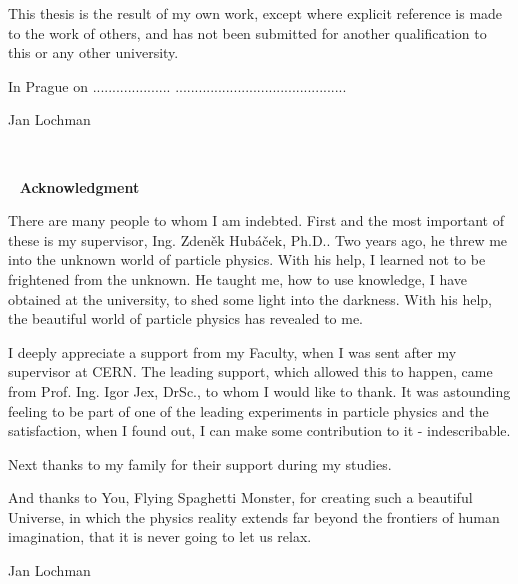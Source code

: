 \documentclass[a4paper,11pt,twoside,openright]{book}
\newcommand{\autor}{Jan Lochman}
\begin{document}
\vspace{0.5cm} 
This thesis is the result of my own work, except where explicit reference
is made to the work of others, and has not been submitted for another
qualification to this or any other university.

\vspace{5mm}In Prague on ....................\hfill 
............................................       
\begin{flushright}
  \autor 
\end{flushright}

\newpage 
\thispagestyle{empty}  
~
   
\newpage 
\thispagestyle{empty}  
~
\vfill 
{\bf Acknowledgment} 

\vspace{0.5cm} 
There are many people to whom I am indebted. First and the most important of
these is my supervisor, Ing. Zden\v{e}k Hub\'{a}\v{c}ek, Ph.D.. Two years ago,
he threw me into the unknown world of particle physics. With his help, I learned
not to be frightened from the unknown. He taught me, how to use knowledge, I have
obtained at the university, to shed some light into the darkness. With his help,
the beautiful world of particle physics has revealed to me.

I deeply appreciate a support from my Faculty, when I was sent after my
supervisor at CERN. The leading support, which allowed this to happen, came from
Prof. Ing. Igor Jex, DrSc., to whom I would like to thank. It was astounding
feeling to be part of one of the leading experiments in particle physics and the
satisfaction, when I found out, I can make some contribution to it -
indescribable. 

Next thanks to my family for their support during my studies.

And thanks to You, Flying Spaghetti Monster, for creating such a beautiful
Universe, in which the physics reality extends far beyond the frontiers of human
imagination, that it is never going to let us relax.



\begin{flushright}
  \autor 
\end{flushright}

\newpage 
\thispagestyle{empty}  
~
\end{document}
